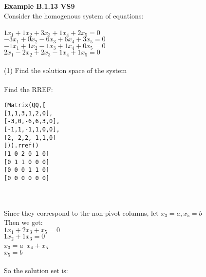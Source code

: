 \documentclass{article}
\begin{document}
\textbf{Example B.1.13 VS9}\\
Consider the homogenous system of equations:\\
\\
$1x_{1} + 1x_{2} + 3x_{3} + 1x_{4} + 2x_{5} = 0$\\
$-3x_{1} + 0x_{2} - 6x_{3} + 6x_{4} + 3x_{5} = 0$\\
$-1x_{1} + 1x_{2} - 1x_{3} + 1x_{4} + 0x_{5} = 0$\\
$2x_{1} - 2x_{2} + 2x_{3} - 1x_{4} + 1x_{5} = 0$\\
\\
(1) Find the solution space of the system\\
\\
Find the RREF:
\begin{verbatim}
(Matrix(QQ,[
[1,1,3,1,2,0],
[-3,0,-6,6,3,0],
[-1,1,-1,1,0,0],
[2,-2,2,-1,1,0]
])).rref()
[1 0 2 0 1 0]
[0 1 1 0 0 0]
[0 0 0 1 1 0]
[0 0 0 0 0 0]
\end{verbatim}\\
\\
Since they correspond to the non-pivot columns, let $x_{3} = a, x_{5} = b$\\
Then we get:\\
$1x_{1} + 2x_{3} + x_{5} = 0$\\
$1x_{2} + 1x_{3} = 0$\\
$x_{3} = a$\
$x_{4} + x_{5}$\\
$x_{5} = b$\\
\\
So the solution set is:\\
\\
\end{document}

